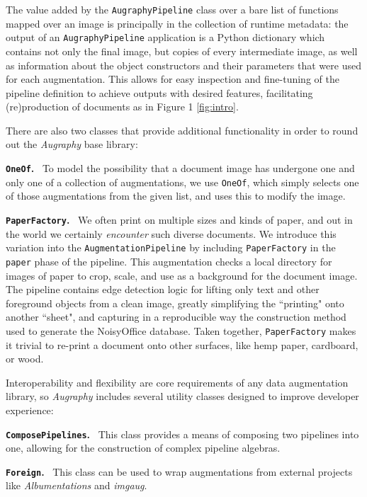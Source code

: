 \documentclass[runningheads]{llncs}
\begin{document}
The value added by the \texttt{AugraphyPipeline} class over a bare list of functions mapped over an image is principally in the collection of runtime metadata:
the output of an \texttt{AugraphyPipeline} application is a Python dictionary which contains not only the final image, but copies of every intermediate image, as well as information about the object constructors and their parameters that were used for each augmentation.
This allows for easy inspection and fine-tuning of the pipeline definition to achieve outputs with desired features, facilitating (re)production of documents as in Figure 1 \ref{fig:intro}.

\smallskip
There are also two classes that provide additional functionality in order to round out the \emph{Augraphy} base library:

\noindent\textbf{\texttt{OneOf}.} ~To model the possibility that a document image has undergone one and only one of a collection of augmentations, we use \texttt{OneOf}, which simply selects one of those augmentations from the given list, and uses this to modify the image.

\smallskip
\noindent\textbf{\texttt{PaperFactory}.} ~We often print on multiple sizes and kinds of paper, and out in the world we certainly \textit{encounter} such diverse documents.
We introduce this variation into the \texttt{AugmentationPipeline} by including \texttt{PaperFactory} in the \texttt{paper} phase of the pipeline.
This augmentation checks a local directory for images of paper to crop, scale, and use as a background for the document image.
The pipeline contains edge detection logic for lifting only text and other foreground objects from a clean image, greatly simplifying the ``printing" onto another ``sheet", and capturing in a reproducible way the construction method used to generate the NoisyOffice database.
Taken together, \texttt{PaperFactory} makes it trivial to re-print a document onto other surfaces, like hemp paper, cardboard, or wood.

\smallskip
Interoperability and flexibility are core requirements of any data augmentation library, so \emph{Augraphy} includes several utility classes designed to improve developer experience:

\noindent\textbf{\texttt{ComposePipelines}.} ~This class provides a means of composing two pipelines into one, allowing for the construction of complex pipeline algebras.

\smallskip
\noindent\textbf{\texttt{Foreign}.} ~This class can be used to wrap augmentations from external projects like \emph{Albumentations} and \emph{imgaug}.
\end{document}
